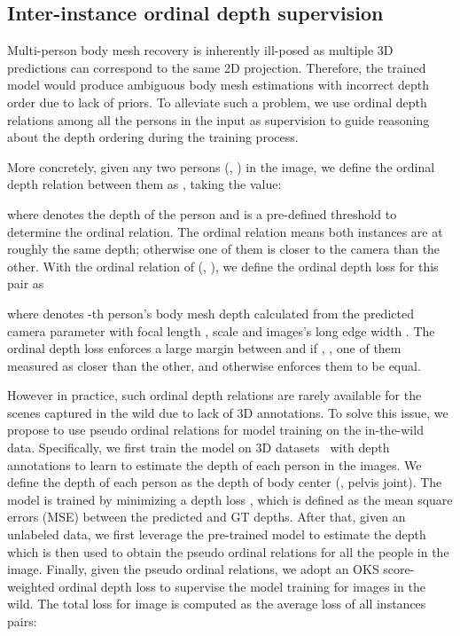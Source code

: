 \documentclass[final]{cvpr}
\begin{document}
\subsection{Inter-instance ordinal depth supervision} \label{sec:orloss}
Multi-person body mesh recovery is inherently ill-posed as multiple 3D predictions can correspond to the same 2D projection.
Therefore, the trained model would produce ambiguous body mesh estimations with incorrect depth order due to lack of priors.
To alleviate such a problem, we use ordinal depth relations among all the persons in the input as supervision to guide reasoning about the depth ordering during the training process.

More concretely, given any two persons (, ) in the image, we define the ordinal depth relation between them as , taking the value:

where  denotes the depth of the person  and  is a pre-defined threshold to determine the ordinal relation. 
The ordinal relation  means both instances are at roughly the same depth; otherwise one of them is closer to the camera than the other.
With the ordinal relation of (, ), we define the ordinal depth loss for this pair as

where  denotes -th person's body mesh depth calculated from the predicted camera parameter with focal length , scale  and images's long edge width .
The ordinal depth loss enforces a large margin between  and  if , \ie, one of them measured as closer than the other, and otherwise enforces them to be equal.

However in practice, such ordinal depth relations are rarely available for the scenes captured in the wild due to lack of 3D annotations. 
To solve this issue, we propose to use pseudo ordinal relations for model training on the in-the-wild data.
Specifically, we first train the model on 3D datasets~\cite{ionescu2014human3,singleshotmultiperson2018} with depth annotations to learn to estimate the depth of each person in the images.
We define the depth  of each person as the depth of body center (\ie, pelvis joint). 
The model is trained by minimizing a depth loss , which is defined as the mean square errors (MSE) between the predicted and GT depths. 
After that, given an unlabeled data, we first leverage the pre-trained model to estimate the depth which is then used to obtain the pseudo ordinal relations for all the people in the image. Finally, given the pseudo ordinal relations, we adopt an OKS score-weighted ordinal depth loss to supervise the model training for images in the wild. The total loss for image  is computed as the average loss of all instances pairs:
\end{document}

